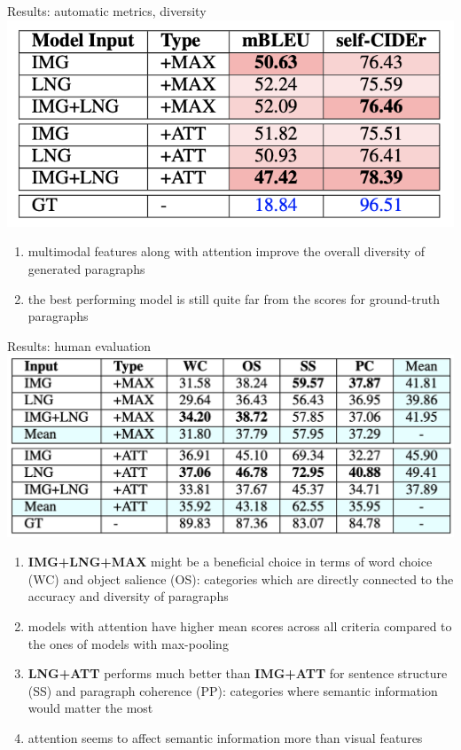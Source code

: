 \documentclass[notes=hide]{beamer}
\begin{document}
\begin{frame}{Results: automatic metrics, diversity}
\small
\center
\includegraphics[width=.7\textwidth]{res2.png}
\begin{enumerate}
\item multimodal features along with attention improve the overall diversity of generated paragraphs
\pause
\item the best performing model is still quite far from the scores for ground-truth paragraphs
\end{enumerate}
\end{frame}

\begin{frame}{Results: human evaluation}
\small
\center
\includegraphics[width=.7\textwidth]{res3.png}
\begin{enumerate}
\pause
\item \textbf{IMG+LNG+MAX} might be a beneficial choice in terms of word choice (WC) and object salience (OS): categories which are directly connected to the accuracy and diversity of paragraphs
\pause
\item models with attention have higher mean scores across all criteria compared to the ones of models with max-pooling
\pause
\item \textbf{LNG+ATT} performs much better than \textbf{IMG+ATT} for sentence structure (SS) and paragraph coherence (PP): categories where semantic information would matter the most
\pause
\item attention seems to affect semantic information more than visual features
\end{enumerate}
\end{frame}
\end{document}

